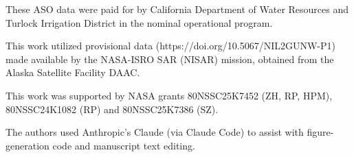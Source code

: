 \documentclass[tc, manuscript]{copernicus}
\begin{document}



\begin{acknowledgements}
These ASO data were paid for by California Department of Water Resources and Turlock Irrigation District in the nominal operational program.

This work utilized provisional data (https://doi.org/10.5067/NIL2GUNW-P1) made available by the NASA-ISRO SAR (NISAR) mission, obtained from the Alaska Satellite Facility DAAC.

This work was supported by NASA grants 80NSSC25K7452 (ZH, RP, HPM), 80NSSC24K1082 (RP) and 80NSSC25K7386 (SZ).

The authors used Anthropic's Claude (via Claude Code) to assist with figure-generation code and manuscript text editing.
\end{acknowledgements}



\end{document}
